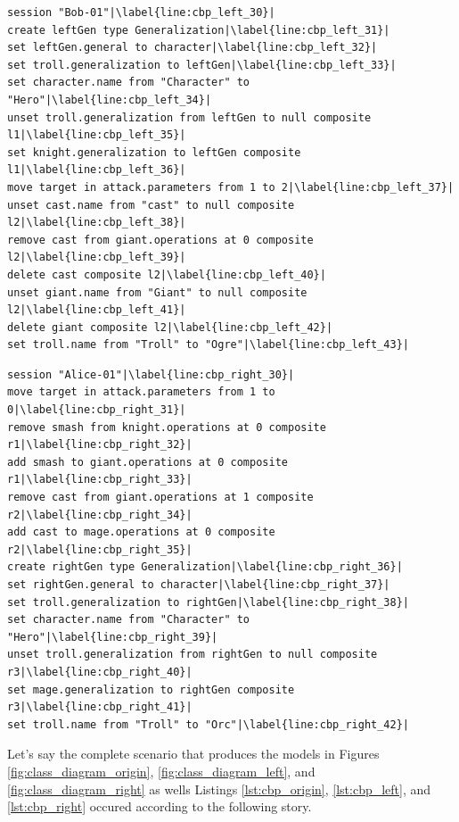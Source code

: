 \begin{lstlisting}[firstnumber=30,style=eol,escapechar=|,caption={The appended events made by Bob to produce the left version in Figure \ref{fig:class_diagram_left} (left version).},label=lst:cbp_left]
session "Bob-01"|\label{line:cbp_left_30}|
create leftGen type Generalization|\label{line:cbp_left_31}|
set leftGen.general to character|\label{line:cbp_left_32}|
set troll.generalization to leftGen|\label{line:cbp_left_33}|
set character.name from "Character" to "Hero"|\label{line:cbp_left_34}|
unset troll.generalization from leftGen to null composite l1|\label{line:cbp_left_35}|
set knight.generalization to leftGen composite l1|\label{line:cbp_left_36}|
move target in attack.parameters from 1 to 2|\label{line:cbp_left_37}|
unset cast.name from "cast" to null composite l2|\label{line:cbp_left_38}|
remove cast from giant.operations at 0 composite l2|\label{line:cbp_left_39}|
delete cast composite l2|\label{line:cbp_left_40}|
unset giant.name from "Giant" to null composite l2|\label{line:cbp_left_41}|
delete giant composite l2|\label{line:cbp_left_42}|
set troll.name from "Troll" to "Ogre"|\label{line:cbp_left_43}|
\end{lstlisting}

\begin{lstlisting}[firstnumber=30,style=eol,escapechar=|,caption={The appended events made by Alice to produce the right version in Figure \ref{fig:class_diagram_right} (right version).},label=lst:cbp_right]
session "Alice-01"|\label{line:cbp_right_30}|
move target in attack.parameters from 1 to 0|\label{line:cbp_right_31}|
remove smash from knight.operations at 0 composite r1|\label{line:cbp_right_32}|
add smash to giant.operations at 0 composite r1|\label{line:cbp_right_33}|
remove cast from giant.operations at 1 composite r2|\label{line:cbp_right_34}|
add cast to mage.operations at 0 composite r2|\label{line:cbp_right_35}|
create rightGen type Generalization|\label{line:cbp_right_36}|
set rightGen.general to character|\label{line:cbp_right_37}|
set troll.generalization to rightGen|\label{line:cbp_right_38}|
set character.name from "Character" to "Hero"|\label{line:cbp_right_39}|
unset troll.generalization from rightGen to null composite r3|\label{line:cbp_right_40}|
set mage.generalization to rightGen composite r3|\label{line:cbp_right_41}|
set troll.name from "Troll" to "Orc"|\label{line:cbp_right_42}|
\end{lstlisting}

Let's say the complete scenario that produces the models in Figures \ref{fig:class_diagram_origin}, \ref{fig:class_diagram_left}, and \ref{fig:class_diagram_right} as wells Listings \ref{lst:cbp_origin}, \ref{lst:cbp_left}, and \ref{lst:cbp_right} occured according to the following story.


